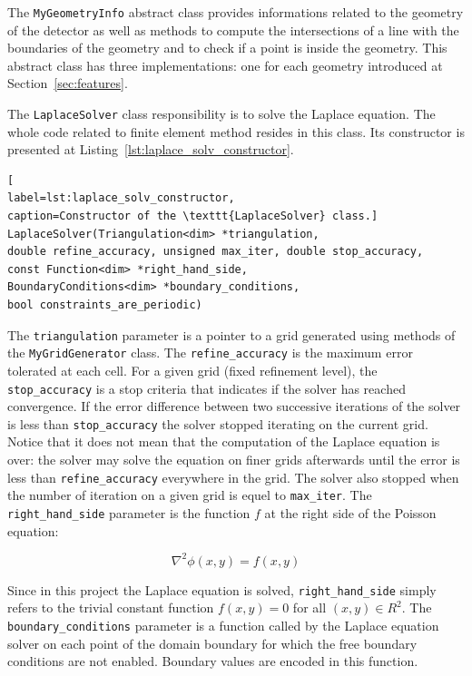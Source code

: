 \documentclass[11pt]{article}
\begin{document}
		The \texttt{MyGeometryInfo} abstract class provides informations
		related to the
		geometry of the detector as well as methods to compute the intersections of a
		line with the boundaries of the geometry and to check if a point is inside
		the geometry. This abstract class has three implementations: one for each
		geometry introduced at Section~\ref{sec:features}.

		The \texttt{LaplaceSolver} class responsibility is to solve the Laplace equation.
		The whole code related to finite element method resides in this class.
		Its constructor is presented at Listing~\ref{lst:laplace_solv_constructor}.
		\newline

		\begin{lstlisting}[
label=lst:laplace_solv_constructor,
caption=Constructor of the \texttt{LaplaceSolver} class.]
LaplaceSolver(Triangulation<dim> *triangulation,
double refine_accuracy, unsigned max_iter, double stop_accuracy,
const Function<dim> *right_hand_side,
BoundaryConditions<dim> *boundary_conditions,
bool constraints_are_periodic)
		\end{lstlisting}

		The \texttt{triangulation} parameter is a pointer to a grid generated using methods of
		the \texttt{MyGridGenerator} class. The \texttt{refine\_accuracy} is the maximum
		error tolerated at each cell. For a given grid (fixed refinement level),
		the \texttt{stop\_accuracy}  is a stop criteria that indicates if the solver has
		reached convergence. If the error difference between two successive iterations
		of the solver is less than \texttt{stop\_accuracy} the solver stopped iterating
		on the current grid. Notice that it does not mean that the computation of the
		Laplace equation is over: the solver may solve the equation on finer grids
		afterwards until the error is less than \texttt{refine\_accuracy} everywhere
		in the grid. The solver also stopped when the number of iteration on a given
		grid is equel to \texttt{max\_iter}. The \texttt{right\_hand\_side} parameter
		is the function $f$ at the right side of the Poisson equation:

		\[\nabla^2 \phi(x,y) = f(x,y)\]

		Since in this project the Laplace equation is solved, \texttt{right\_hand\_side}
		simply refers to the trivial constant function $f(x,y) = 0$ for all $(x,y) \in R^2$.
		The \texttt{boundary\_conditions} parameter is a function called by the Laplace
		equation solver on each point of the domain boundary for which the free
		boundary conditions are not enabled. Boundary values are encoded in this function.
\end{document}
